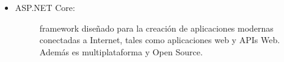 \begin{itemize}
    \item   \begin{description}
                \item[ASP.NET Core:] framework diseñado para la creación de aplicaciones modernas conectadas a Internet, tales como aplicaciones web y APIs Web. Además es multiplataforma y Open Source.
            \end{description}    
\end{itemize}